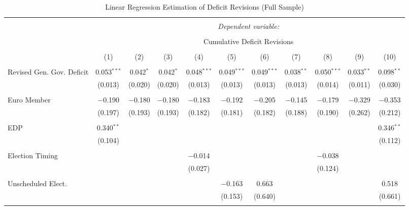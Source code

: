 
\begin{table}[!htbp] \centering 
  \caption{Linear Regression Estimation of Deficit Revisions (Full Sample)} 
  \label{deficit_results} 
\tiny 
\begin{tabular}{@{\extracolsep{5pt}}lcccccccccc} 
\\[-1.8ex]\hline 
\hline \\[-1.8ex] 
 & \multicolumn{10}{c}{\textit{Dependent variable:}} \\ 
\cline{2-11} 
\\[-1.8ex] & \multicolumn{10}{c}{Cumulative Deficit Revisions} \\ 
\\[-1.8ex] & (1) & (2) & (3) & (4) & (5) & (6) & (7) & (8) & (9) & (10)\\ 
\hline \\[-1.8ex] 
 Revised Gen. Gov. Deficit & 0.053$^{***}$ & 0.042$^{*}$ & 0.042$^{*}$ & 0.048$^{***}$ & 0.049$^{***}$ & 0.049$^{***}$ & 0.038$^{**}$ & 0.050$^{***}$ & 0.033$^{**}$ & 0.098$^{**}$ \\ 
  & (0.013) & (0.020) & (0.020) & (0.013) & (0.013) & (0.013) & (0.013) & (0.014) & (0.011) & (0.030) \\ 
  & & & & & & & & & & \\ 
 Euro Member & $-$0.190 & $-$0.180 & $-$0.180 & $-$0.183 & $-$0.192 & $-$0.205 & $-$0.145 & $-$0.179 & $-$0.329 & $-$0.353 \\ 
  & (0.197) & (0.193) & (0.193) & (0.182) & (0.181) & (0.182) & (0.188) & (0.190) & (0.262) & (0.212) \\ 
  & & & & & & & & & & \\ 
 EDP & 0.340$^{**}$ &  &  &  &  &  &  &  &  & 0.346$^{**}$ \\ 
  & (0.104) &  &  &  &  &  &  &  &  & (0.112) \\ 
  & & & & & & & & & & \\ 
 Election Timing &  &  &  & $-$0.014 &  &  &  & $-$0.038 &  &  \\ 
  &  &  &  & (0.027) &  &  &  & (0.124) &  &  \\ 
  & & & & & & & & & & \\ 
 Unscheduled Elect. &  &  &  &  & $-$0.163 & 0.663 &  &  &  & 0.518 \\ 
  &  &  &  &  & (0.153) & (0.640) &  &  &  & (0.661) \\ 
  & & & & & & & & & & \\ 

\end{tabular}
\end{table}
